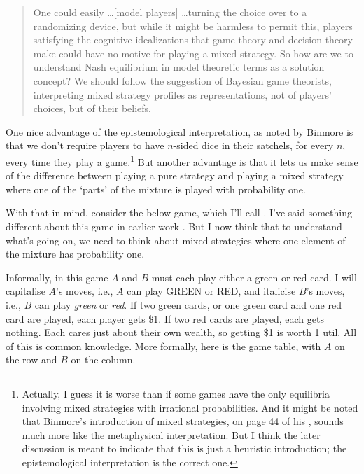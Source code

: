 \begin{quote}One could easily \dots [model players] \dots turning the choice over to a randomizing device, but while it might be harmless to permit this, players satisfying the cognitive idealizations that game theory and decision theory make could have no motive for playing a mixed strategy. So how are we to understand Nash equilibrium in model theoretic terms as a solution concept? We should follow the suggestion of Bayesian game theorists, interpreting mixed strategy profiles as representations, not of players' choices, but of their beliefs. \citep[57-8]{Stalnaker1994}
\end{quote}
One nice advantage of the epistemological interpretation, as noted by Binmore \citeyearpar[185]{Binmore2007} %
is that we don't require players to have $n$-sided dice in their satchels, for every $n$, every time they play a game.\footnote{Actually, I guess it is worse than if some games have the only equilibria involving mixed strategies with irrational probabilities. And it might be noted that Binmore's introduction of mixed strategies, on page 44 of his \citeyearpar{Binmore2007}, sounds much more like the metaphysical interpretation. But I think the later discussion is meant to indicate that this is just a heuristic introduction; the epistemological interpretation is the correct one.} But another advantage is that it lets us make sense of the difference between playing a pure strategy and playing a mixed strategy where one of the `parts' of the mixture is played with probability one. 

With that in mind, consider the below game, which I'll call \RG. I've said something different about this game in earlier work \citep{Weatherson2012-WEAGAT}. But I now think that to understand what's going on, we need to think about mixed strategies where one element of the mixture has probability one.

Informally, in this game $A$ and $B$ must each play either a green or red card. I will capitalise $A$'s moves, i.e., $A$ can play GREEN or RED, and italicise $B$'s moves, i.e., $B$ can play \textit{green} or \textit{red}. If two green cards, or one green card and one red card are played, each player gets \$1. If two red cards are played, each gets nothing. Each cares just about their own wealth, so getting \$1 is worth 1 util. All of this is common knowledge. More formally, here is the game table, with $A$ on the row and $B$ on the column.

